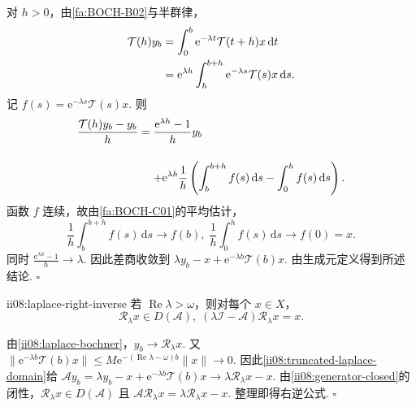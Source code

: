 \begin{FAProof}
对 \(\displaystyle h>0\)，由\autoref{fa:BOCH-B02}与半群律，
\[
\begin{aligned}
\displaystyle \mathcal T(h)y_b &\displaystyle = \int_0^b\mathrm{e}^{-\lambda t}\mathcal T(t+h)x\,\mathrm{d}t\\
\displaystyle &\displaystyle = \mathrm{e}^{\lambda h} \int_h^{b+h}\mathrm{e}^{-\lambda s}\mathcal T(s)x\,\mathrm{d}s.
\end{aligned}
\]
记 \(\displaystyle f(s)=\mathrm{e}^{-\lambda s}\mathcal T(s)x\). 则
\[
\begin{aligned}
\displaystyle \frac{\mathcal T(h)y_b-y_b}{h} &\displaystyle = \frac{\mathrm{e}^{\lambda h}-1}{h}y_b\\[12pt]
\displaystyle &\displaystyle \mathrel{\phantom{=}}+ \mathrm{e}^{\lambda h} \frac{1}{h} \left( \int_b^{b+h}f(s)\,\mathrm{d}s - \int_0^hf(s)\,\mathrm{d}s \right).
\end{aligned}
\]
函数 \(\displaystyle f\) 连续，故由\autoref{fa:BOCH-C01}的平均估计，
\[
\frac{1}{h}\int_b^{b+h}f(s)\,\mathrm{d}s
\longrightarrow
f(b),
\;
\frac{1}{h}\int_0^hf(s)\,\mathrm{d}s
\longrightarrow
f(0)=x.
\]
同时 \(\displaystyle\frac{\mathrm{e}^{\lambda h}-1}{h}\to\lambda\). 因此差商收敛到
\(\displaystyle \lambda y_b-x+ \mathrm{e}^{-\lambda b}\mathcal T(b)x.\)
由生成元定义得到所述结论.
\hfill\(\square\)
\end{FAProof}

\begin{FAProposition}{ii08:laplace-right-inverse}
若 \(\displaystyle\operatorname{Re}\lambda>\omega\)，则对每个 \(\displaystyle x\in X\)，
\[
\mathcal R_\lambda x\in D(\mathcal A),
\;
(\lambda\mathcal I-\mathcal A)\mathcal R_\lambda x=x.
\]
\end{FAProposition}

\begin{FAProof}
由\autoref{ii08:laplace-bochner}，\(\displaystyle y_b\to\mathcal R_\lambda x\). 又
\(\displaystyle \|\mathrm{e}^{-\lambda b}\mathcal T(b)x\| \leqslant M\mathrm{e}^{-(\operatorname{Re}\lambda-\omega)b}\|x\| \longrightarrow0.\)
因此\autoref{ii08:truncated-laplace-domain}给
\(\displaystyle \mathcal Ay_b = \lambda y_b-x+ \mathrm{e}^{-\lambda b}\mathcal T(b)x \longrightarrow \lambda\mathcal R_\lambda x-x.\)
由\autoref{ii08:generator-closed}的闭性，\(\displaystyle\mathcal R_\lambda x\in D(\mathcal A)\) 且 \(\displaystyle\mathcal A\mathcal R_\lambda x=\lambda\mathcal R_\lambda x-x\). 整理即得右逆公式.
\hfill\(\square\)
\end{FAProof}

